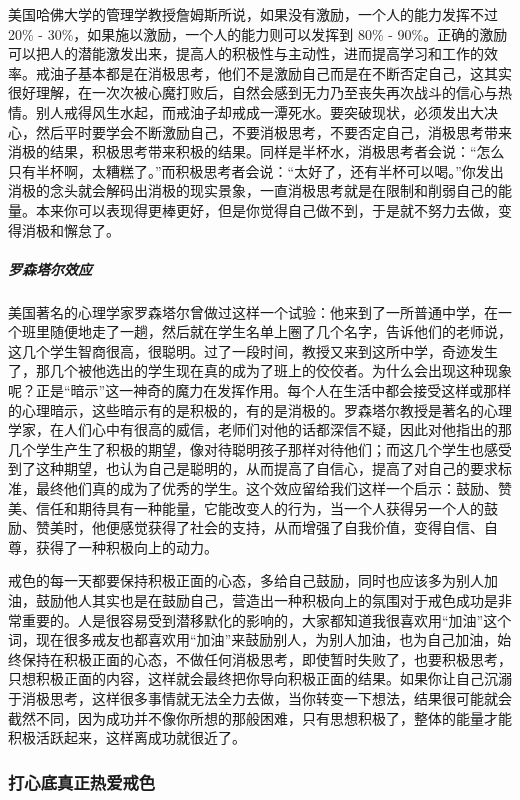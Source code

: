 美国哈佛大学的管理学教授詹姆斯所说，如果没有激励，一个人的能力发挥不过 20\% - 30\%，如果施以激励，一个人的能力则可以发挥到 80\% - 90\%。正确的激励可以把人的潜能激发出来，提高人的积极性与主动性，进而提高学习和工作的效率。戒油子基本都是在消极思考，他们不是激励自己而是在不断否定自己，这其实很好理解，在一次次被心魔打败后，自然会感到无力乃至丧失再次战斗的信心与热情。别人戒得风生水起，而戒油子却戒成一潭死水。要突破现状，必须发出大决心，然后平时要学会不断激励自己，不要消极思考，不要否定自己，消极思考带来消极的结果，积极思考带来积极的结果。同样是半杯水，消极思考者会说：“怎么只有半杯啊，太糟糕了。”而积极思考者会说：“太好了，还有半杯可以喝。”你发出消极的念头就会解码出消极的现实景象，一直消极思考就是在限制和削弱自己的能量。本来你可以表现得更棒更好，但是你觉得自己做不到，于是就不努力去做，变得消极和懈怠了。

\subparagraph{罗森塔尔效应}

美国著名的心理学家罗森塔尔曾做过这样一个试验：他来到了一所普通中学，在一个班里随便地走了一趟，然后就在学生名单上圈了几个名字，告诉他们的老师说，这几个学生智商很高，很聪明。过了一段时间，教授又来到这所中学，奇迹发生了，那几个被他选出的学生现在真的成为了班上的佼佼者。为什么会出现这种现象呢？正是“暗示”这一神奇的魔力在发挥作用。每个人在生活中都会接受这样或那样的心理暗示，这些暗示有的是积极的，有的是消极的。罗森塔尔教授是著名的心理学家，在人们心中有很高的威信，老师们对他的话都深信不疑，因此对他指出的那几个学生产生了积极的期望，像对待聪明孩子那样对待他们；而这几个学生也感受到了这种期望，也认为自己是聪明的，从而提高了自信心，提高了对自己的要求标准，最终他们真的成为了优秀的学生。这个效应留给我们这样一个启示：鼓励、赞美、信任和期待具有一种能量，它能改变人的行为，当一个人获得另一个人的鼓励、赞美时，他便感觉获得了社会的支持，从而增强了自我价值，变得自信、自尊，获得了一种积极向上的动力。

戒色的每一天都要保持积极正面的心态，多给自己鼓励，同时也应该多为别人加油，鼓励他人其实也是在鼓励自己，营造出一种积极向上的氛围对于戒色成功是非常重要的。人是很容易受到潜移默化的影响的，大家都知道我很喜欢用“加油”这个词，现在很多戒友也都喜欢用“加油”来鼓励别人，为别人加油，也为自己加油，始终保持在积极正面的心态，不做任何消极思考，即使暂时失败了，也要积极思考，只想积极正面的内容，这样就会最终把你导向积极正面的结果。如果你让自己沉溺于消极思考，这样很多事情就无法全力去做，当你转变一下想法，结果很可能就会截然不同，因为成功并不像你所想的那般困难，只有思想积极了，整体的能量才能积极活跃起来，这样离成功就很近了。

\subsubsection{打心底真正热爱戒色}


